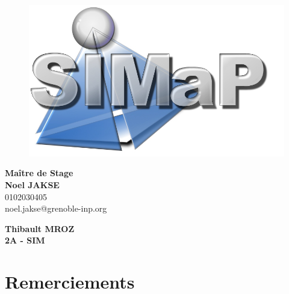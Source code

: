 \documentclass[11pt]{report}
\begin{document}
\begin{titlepage}
\begin{center}
        \begin{figure}[!h]
            \centering
            \includegraphics[scale=1.2]{logo_SIMaP_801.png}
        \end{figure}
              \vfill 
        
        \begin{minipage}[d]{1\linewidth}
            \begin{flushright} \large
            \textbf{Maître de Stage}\\
                \textbf{Noel JAKSE}\\
                0102030405\\
                noel.jakse@grenoble-inp.org
            \end{flushright}
        \end{minipage}
        
        \bigskip
             
        \begin{minipage}[d]{1\linewidth}
              \begin{flushleft} \large
              \textbf{Thibault MROZ}\\
                \textbf{2A - SIM}\\
              \end{flushleft}
         \end{minipage}
          \end{center}        
\end{titlepage}

\tableofcontents

\setcounter{chapter}{0}
    \chapter*{Remerciements}
\end{document}
